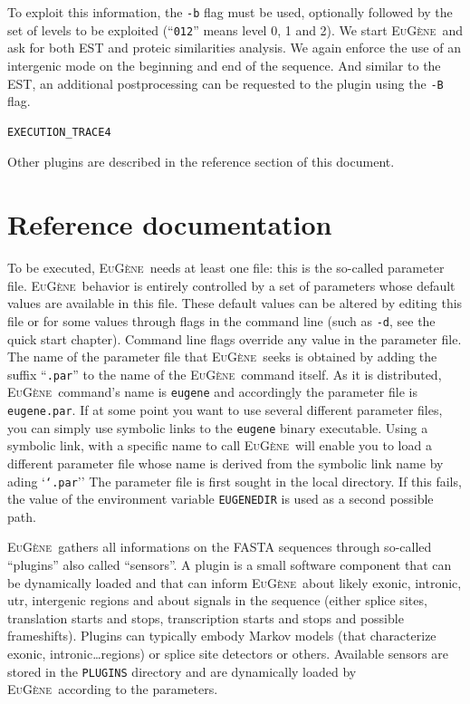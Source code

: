 \documentclass[a4paper,titlepage]{report}
\newcommand{\EuGene}{\textsc{EuG\`ene}}
\begin{document}
To exploit this information, the \texttt{-b} flag must be used,
optionally followed by the set of levels to be exploited
(``\texttt{012}'' means level 0, 1 and 2).  We start \EuGene\ and ask
for both EST and proteic similarities analysis. We again enforce the
use of an intergenic mode on the beginning and end of the sequence.
And similar to the EST, an additional postprocessing can be requested
to the plugin using the \texttt{-B} flag.

\begin{Verbatim}[fontsize=\scriptsize]
EXECUTION_TRACE4
\end{Verbatim}

Other plugins are described in the reference section of this document.

\newpage
\chapter{Reference documentation}

To be executed, \EuGene\ needs at least one file: this is the
so-called parameter file.  \EuGene\ behavior is entirely controlled
by a set of parameters whose default values are available in this
file. These default values can be altered by editing this file or for
some values through flags in the command line (such as \texttt{-d},
see the quick start chapter). Command line flags override any value in the parameter
file. The name of the parameter file that \EuGene\ seeks is obtained
by adding the suffix ``\texttt{.par}'' to the name of the \EuGene\ 
command itself.  As it is distributed, \EuGene\ command's name is
\texttt{eugene} and accordingly the parameter file is
\texttt{eugene.par}. If at some point you want to use several
different parameter files, you can simply use symbolic links to the
\texttt{eugene} binary executable. Using a symbolic link, with a
specific name to call \EuGene\ will enable you to load a different
parameter file whose name is derived from the symbolic link name by
ading `\texttt{`.par}'' The parameter file is first sought in the
local directory.  If this fails, the value of the environment variable
\texttt{EUGENEDIR} is used as a second possible path.

\EuGene\ gathers all informations on the FASTA sequences through
so-called ``plugins'' also called ``sensors''. A plugin is a small
software component that can be dynamically loaded and that can inform
\EuGene\ about likely exonic, intronic, utr, intergenic regions and
about signals in the sequence (either splice sites, translation starts
and stops, transcription starts and stops and possible frameshifts).
Plugins can typically embody Markov models (that characterize exonic,
intronic\ldots regions) or splice site detectors or others.  Available
sensors are stored in the \texttt{PLUGINS} directory and are
dynamically loaded by \EuGene\ according to the parameters.
\end{document}
